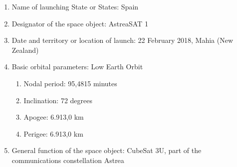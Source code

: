 \begin{enumerate}[label=\alph*)]
\item Name of launching State or States: Spain
\item Designator of the space object: AstreaSAT 1
\item Date and territory or location of launch: 22 February 2018, Mahia (New Zealand)
\item Basic orbital parameters: Low Earth Orbit
\begin{enumerate}[label=\Roman*)]
\item Nodal period: 95,4815 minutes
\item Inclination: 72 degrees
\item Apogee: 6.913,0 km
\item Perigee: 6.913,0 km
\end{enumerate}
\item General function of the space object: CubeSat 3U, part of the communications constellation Astrea
\end{enumerate}
